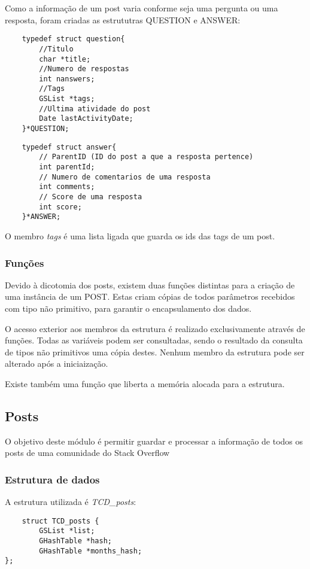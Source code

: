\documentclass[10pt]{article}
\begin{document}
	Como a informação de um post varia conforme seja uma pergunta ou uma resposta, foram criadas as estrututras QUESTION e ANSWER:
\begin{lstlisting}
	typedef struct question{
		//Titulo
		char *title;
		//Numero de respostas 
		int nanswers;
		//Tags 
		GSList *tags;
		//Ultima atividade do post 
		Date lastActivityDate;
	}*QUESTION;
	\end{lstlisting}
	\begin{lstlisting}
	typedef struct answer{
		// ParentID (ID do post a que a resposta pertence) 
		int parentId;
		// Numero de comentarios de uma resposta 
		int comments;
		// Score de uma resposta 
		int score;
	}*ANSWER;
	\end{lstlisting}

	O membro \emph{tags} é uma lista ligada que guarda os ids das tags de um post.

\subsubsection{Funções}

	Devido à dicotomia dos posts, existem duas funções distintas para a criação de uma instância de um POST. Estas criam cópias de todos parâmetros recebidos com tipo não primitivo, para garantir o encapsulamento dos dados.

	O acesso exterior aos membros da estrutura é realizado exclusivamente através de funções. Todas as variáveis podem ser consultadas, sendo o resultado da consulta de tipos não primitivos uma cópia destes. Nenhum membro da estrutura pode ser alterado após a iniciaização.

	Existe também uma função que liberta a memória alocada para a estrutura.

\subsection{Posts}
	O objetivo deste módulo é permitir guardar e processar a informação de todos os posts de uma comunidade do Stack Overflow
\subsubsection{Estrutura de dados}

	A estrutura utilizada é \emph{TCD\_posts}:
	\begin{lstlisting}
	struct TCD_posts {
		GSList *list;
		GHashTable *hash;
		GHashTable *months_hash; 
};
	\end{lstlisting}
\end{document}
